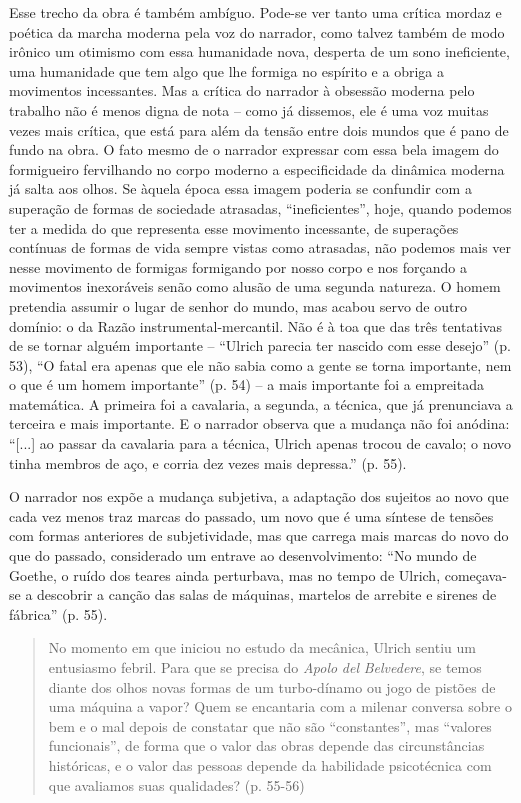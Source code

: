 Esse trecho da obra é também ambíguo. Pode-se ver tanto uma crítica
mordaz e poética da marcha moderna pela voz do narrador, como talvez
também de modo irônico um otimismo com essa humanidade nova, desperta de
um sono ineficiente, uma humanidade que tem algo que lhe formiga no
espírito e a obriga a movimentos incessantes. Mas a crítica do narrador
à obsessão moderna pelo trabalho não é menos digna de nota -- como já
dissemos, ele é uma voz muitas vezes mais crítica, que está para além da
tensão entre dois mundos que é pano de fundo na obra. O fato mesmo de o
narrador expressar com essa bela imagem do formigueiro fervilhando no
corpo moderno a especificidade da dinâmica moderna já salta aos olhos.
Se àquela época essa imagem poderia se confundir com a superação de
formas de sociedade atrasadas, ``ineficientes'', hoje, quando podemos
ter a medida do que representa esse movimento incessante, de superações
contínuas de formas de vida sempre vistas como atrasadas, não podemos
mais ver nesse movimento de formigas formigando por nosso corpo e nos
forçando a movimentos inexoráveis senão como alusão de uma segunda
natureza. O homem pretendia assumir o lugar de senhor do mundo, mas
acabou servo de outro domínio: o da Razão instrumental-mercantil. Não é
à toa que das três tentativas de se tornar alguém importante -- ``Ulrich
parecia ter nascido com esse desejo'' (p. 53), ``O fatal era apenas que
ele não sabia como a gente se torna importante, nem o que é um homem
importante'' (p. 54) -- a mais importante foi a empreitada matemática. A
primeira foi a cavalaria, a segunda, a técnica, que já prenunciava a
terceira e mais importante. E o narrador observa que a mudança não foi
anódina: ``{[}...{]} ao passar da cavalaria para a técnica, Ulrich
apenas trocou de cavalo; o novo tinha membros de aço, e corria dez vezes
mais depressa.'' (p. 55).

O narrador nos expõe a mudança subjetiva, a adaptação dos sujeitos ao
novo que cada vez menos traz marcas do passado, um novo que é uma
síntese de tensões com formas anteriores de subjetividade, mas que
carrega mais marcas do novo do que do passado, considerado um entrave ao
desenvolvimento: ``No mundo de Goethe, o ruído dos teares ainda
perturbava, mas no tempo de Ulrich, começava-se a descobrir a canção das
salas de máquinas, martelos de arrebite e sirenes de fábrica'' (p. 55).

\begin{quote}
No momento em que iniciou no estudo da mecânica, Ulrich sentiu um
entusiasmo febril. Para que se precisa do \emph{Apolo} \emph{del}
\emph{Belvedere}, se temos diante dos olhos novas formas de um
turbo-dínamo ou jogo de pistões de uma máquina a vapor? Quem se
encantaria com a milenar conversa sobre o bem e o mal depois de
constatar que não são ``constantes'', mas ``valores funcionais'', de
forma que o valor das obras depende das circunstâncias históricas, e o
valor das pessoas depende da habilidade psicotécnica com que avaliamos
suas qualidades? (p. 55-56)
\end{quote}

